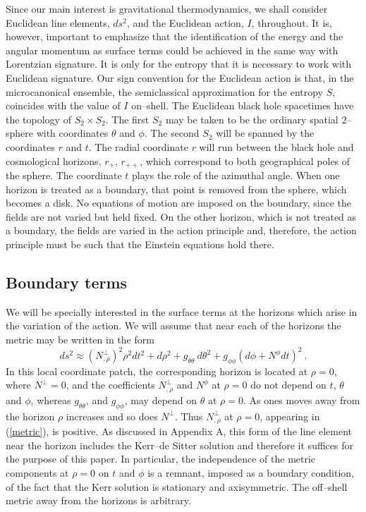 \documentclass[a4paper,preprintnumbers,amsmath,amssymb]{revtex4}
\begin{document}
Since our main interest is gravitational thermodynamics, we shall consider Euclidean line elements, $ds^2$, and the Euclidean action, $I$, throughout. It is, however,
important to emphasize that the identification of the energy and the angular momentum as surface terms could be achieved in the same way with Lorentzian signature. It
is only for the entropy that it is necessary to work with  Euclidean signature. Our sign convention for the Euclidean action is that, in the microcanonical ensemble, the
semiclassical approximation for the entropy $S$, coincides with the value of $I$ on--shell. The Euclidean black hole spacetimes have the topology of $S_2\times
S_2$. The first $S_2$ may be taken to be the ordinary spatial $2$--sphere with coordinates $\theta$ and $\phi$. The second $S_2$ will be spanned by the
coordinates $r$ and $t$. The radial coordinate $r$ will run between the black hole and cosmological horizons, $r_+$, $r_{++}$, which correspond to both
geographical poles of the sphere. The coordinate $t$ plays the role of the azimuthal angle. When one horizon is treated as a boundary, that point is
removed from the sphere, which becomes a disk. No equations of motion are imposed on the boundary, since the fields are not varied but held fixed. On the other
horizon, which is not treated as a boundary, the fields are varied in the action principle and, therefore, the action principle must be such that the Einstein equations hold
there.

\subsection*{Boundary terms}

We will be specially interested in the surface terms at the horizons which arise in the variation of the action. We will assume that near each of the horizons the metric
may be written in the form
\begin{equation}
\label{metric}
ds^2 \approx (N^{\perp}_{,\rho})^2 \rho^2 dt^2 + d\rho^2 + g_{\theta\theta}\ d\theta^2
+ g_{\phi\phi}(d\phi+N^{\phi}dt)^2 \ .
\end{equation}
In this local coordinate patch, the corresponding horizon is located at $\rho=0$, where
$N^{\perp}=0$, and the coefficients $N^{\perp}_{,\rho}$ and $N^{\phi}$ at $\rho=0$ do not depend on $t$, $\theta$ and $\phi$, whereas $g_{\theta\theta}$,
and $g_{\phi\phi}$, may depend on $\theta$ at $\rho=0$. As ones moves away from the horizon $\rho$ increases and so does $N^{\perp}$. Thus
$N^{\perp}_{,\rho}$ at $\rho=0$, appearing in (\ref{metric}), is positive.
As discussed in Appendix A, this form of the line element near the horizon includes the Kerr--de Sitter solution and therefore it suffices for the purpose of this paper. In particular, the independence of the metric components at $\rho=0$ on $t$ and $\phi$ is a remnant, imposed as a boundary condition, of the fact that the Kerr solution is stationary and axisymmetric. The off--shell metric away from the horizons is arbitrary.
\end{document}
